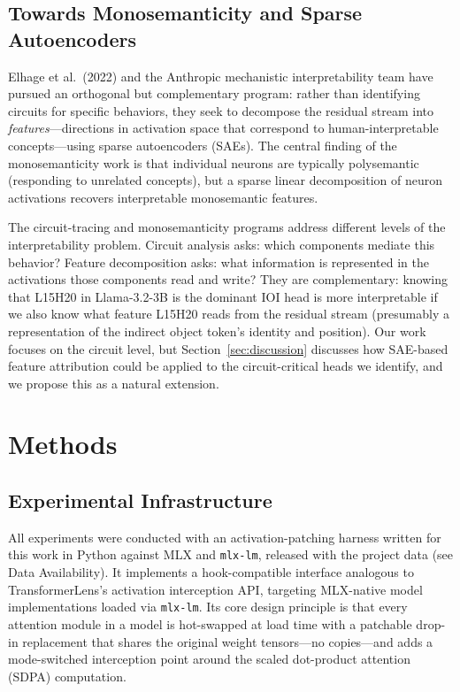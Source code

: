 \documentclass[11pt,a4paper]{article}
\begin{document}
\subsection{Towards Monosemanticity and Sparse Autoencoders}

Elhage et al.\ (2022) \citep{elhage2022toy} and the Anthropic mechanistic
interpretability team have pursued an orthogonal but complementary program: rather than
identifying circuits for specific behaviors, they seek to decompose the residual stream
into \emph{features}---directions in activation space that correspond to
human-interpretable concepts---using sparse autoencoders (SAEs). The central finding
of the monosemanticity work is that individual neurons are typically polysemantic
(responding to unrelated concepts), but a sparse linear decomposition of neuron
activations recovers interpretable monosemantic features.

The circuit-tracing and monosemanticity programs address different levels of the
interpretability problem. Circuit analysis asks: which components mediate this
behavior? Feature decomposition asks: what information is represented in the
activations those components read and write? They are complementary: knowing that
L15H20 in Llama-3.2-3B is the dominant IOI head is more interpretable if we also know
what feature L15H20 reads from the residual stream (presumably a representation of the
indirect object token's identity and position). Our work focuses on the circuit level,
but Section~\ref{sec:discussion} discusses how SAE-based feature attribution could be
applied to the circuit-critical heads we identify, and we propose this as a natural
extension.

\section{Methods}
\label{sec:methods}

\subsection{Experimental Infrastructure}
\label{sec:infrastructure}

All experiments were conducted with an activation-patching harness written for this
work in Python against MLX and \texttt{mlx-lm}, released with the project data (see
Data Availability). It implements a hook-compatible interface analogous to
TransformerLens's activation interception API, targeting MLX-native model
implementations loaded via \texttt{mlx-lm}. Its core design principle is that every attention module in a model
is hot-swapped at load time with a patchable drop-in replacement that shares the
original weight tensors---no copies---and adds a mode-switched interception point
around the scaled dot-product attention (SDPA) computation.
\end{document}
